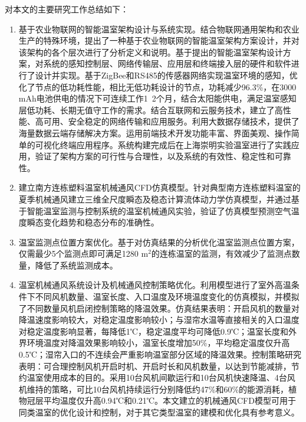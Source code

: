 对本文的主要研究工作总结如下：
	\begin{enumerate}
		\item 基于农业物联网的智能温室架构设计与系统实现。结合物联网通用架构和农业生产的特殊环境，提出了一种基于农业物联网的智能温室架构方案设计，并对该架构的各个层次进行了分析定义和说明。基于提出的智能温室架构设计方案，对系统的感知控制层、网络传输层、应用层和终端接入层的硬件和软件进行了设计并实现。基于ZigBee和RS485的传感器网络实现温室环境的感知，优化了节点的低功耗性能，相比无低功耗设计的节点，功耗减少96.3\%，在3000 mAh电池供电的情况下可连续工作1~2个月，结合太阳能供电，满足温室感知层低功耗、长期无值守工作的需求。结合互联网和云服务技术，建立了高性能、高可用、安全稳定的网络传输和应用服务。利用大数据存储技术，提供了海量数据云端存储解决方案。运用前端技术开发功能丰富、界面美观、操作简单的可视化终端应用程序。系统构建完成后在上海崇明实验温室进行了实践应用，验证了架构方案的可行性与合理性，以及系统的有效性、稳定性和可靠性。
		\item 建立南方连栋塑料温室机械通风CFD仿真模型。针对典型南方连栋塑料温室的夏季机械通风建立三维全尺度瞬态及稳态计算流体动力学仿真模型，并通过基于智能温室监测与控制系统的温室机械通风实验，验证了仿真模型预测空气温度瞬态变化趋势和稳态分布的准确性。
		\item 温室监测点位置方案优化。基于对仿真结果的分析优化温室监测点位置方案，仅需最少5个监测点即可满足1280 $\text{m}^{2}$的连栋温室的监测，有效减少了监测点数量，降低了系统监测成本。
		\item 温室机械通风系统设计及机械通风控制策略优化。利用模型进行了室外高温条件下不同风机数量、温室长度、入口温度及环境温度变化的仿真模拟，并模拟了不同数量风机启闭控制策略的降温效果。仿真结果表明：开启风机的数量对降温速度影响较大，对稳定温度影响较小；与湿帘水温等直接相关的入口温度对稳定温度影响显著，每降低1℃，稳定温度平均可降低0.9℃；温室长度和外界环境温度对降温效果影响较小，温室长度增加50\%，平均稳定温度仅升高0.5℃；湿帘入口的不连续会严重影响温室部分区域的降温效果。控制策略研究表明：可合理控制风机开启时机、开启时长和风机数量，以达到节能减排，节约温室使用成本的目的。采用10台风机间歇运行和10台风机快速降温、4台风机维持的策略，可比10台风机持续运行分别降低约47\%和60\%的能源消耗，植物冠层平均温度仅升高0.94℃和0.21℃。本文建立的机械通风CFD模型可用于同类温室的优化设计和控制，对于其它类型温室的建模和优化具有参考意义。
	\end{enumerate}
